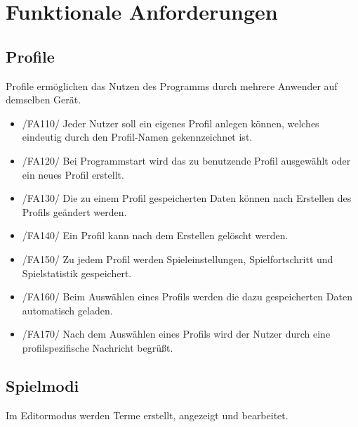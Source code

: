 \section{Funktionale Anforderungen}

\subsection{Profile}

Profile ermöglichen das Nutzen des Programms durch mehrere Anwender auf demselben Gerät.

\begin{itemize}
\item /FA110/ Jeder Nutzer soll ein eigenes Profil anlegen können, welches eindeutig durch den Profil-Namen gekennzeichnet ist. 
\item /FA120/ Bei Programmstart wird das zu benutzende Profil ausgewählt oder ein neues Profil erstellt.
\item /FA130/ Die zu einem Profil gespeicherten Daten können nach Erstellen des Profils geändert werden.
\item /FA140/ Ein Profil kann nach dem Erstellen gelöscht werden.
\item /FA150/ Zu jedem Profil werden Spieleinstellungen, Spielfortschritt und Spielstatistik gespeichert.
\item /FA160/ Beim Auswählen eines Profils werden die dazu gespeicherten Daten automatisch geladen.
\item /FA170/ Nach dem Auswählen eines Profils wird der Nutzer durch eine profilspezifische Nachricht begrüßt.
\end{itemize}

\subsection{Spielmodi}

Im Editormodus werden Terme erstellt, angezeigt und bearbeitet.

